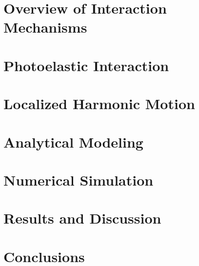 \documentclass[10pt,a4paper]{eitExjobb}
\begin{document}
	\chapter{Overview of Interaction Mechanisms}
	
	\chapter{Photoelastic Interaction}
	
	\chapter{Localized Harmonic Motion}
	
	\chapter{Analytical Modeling}
	
	\chapter{Numerical Simulation}
	
	\chapter{Results and Discussion}
	
	\chapter{Conclusions}
	
\end{document}
